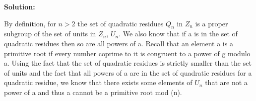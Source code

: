 \documentclass{article}
\begin{document}
\begin{spacing}{1.1}
\textbf{Solution: }

By definition, for $n > 2$ the set of quadratic residues $Q_n$ in $Z_n$ is a proper subgroup of the set of units in $Z_n$, $U_n$.  We also know that if a is in the set of quadratic residues then so are all powers of a.  Recall that an element a is a primitive root if every number coprime to it is congruent to a power of g modulo a.  Using the fact that the set of quadratic residues is strictly smaller than the set of units and the fact that all powers of a are in the set of quadratic residues for a quadratic residue, we know that there exists some elements of $U_n$ that are not a power of a and thus a cannot be a primitive root mod (n).  

\vfill

\end{spacing}
\end{document}
